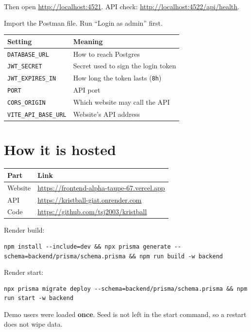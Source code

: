 \documentclass[11pt,a4paper]{article}
\newcommand{\livefront}{https://frontend-alpha-taupe-67.vercel.app}
\newcommand{\liveapi}{https://kristball-giat.onrender.com}
\newcommand{\livegit}{https://github.com/tsj2003/kristball}
\begin{document}
Then open \url{http://localhost:4521}. API check: \url{http://localhost:4522/api/health}.

Import the Postman file. Run ``Login as admin'' first.

\begin{center}
\begin{tabular}{ll}
\toprule
\textbf{Setting} & \textbf{Meaning} \\
\midrule
\texttt{DATABASE\_URL} & How to reach Postgres \\
\texttt{JWT\_SECRET} & Secret used to sign the login token \\
\texttt{JWT\_EXPIRES\_IN} & How long the token lasts (\texttt{8h}) \\
\texttt{PORT} & API port \\
\texttt{CORS\_ORIGIN} & Which website may call the API \\
\texttt{VITE\_API\_BASE\_URL} & Website's API address \\
\bottomrule
\end{tabular}
\end{center}

\section{How it is hosted}

\begin{center}
\begin{tabular}{ll}
\toprule
\textbf{Part} & \textbf{Link} \\
\midrule
Website & \url{\livefront} \\
API & \url{\liveapi} \\
Code & \url{\livegit} \\
\bottomrule
\end{tabular}
\end{center}

Render build:

\begin{lstlisting}
npm install --include=dev && npx prisma generate --schema=backend/prisma/schema.prisma && npm run build -w backend
\end{lstlisting}

Render start:

\begin{lstlisting}
npx prisma migrate deploy --schema=backend/prisma/schema.prisma && npm run start -w backend
\end{lstlisting}

Demo users were loaded \textbf{once}. Seed is not left in the start command, so a restart does not wipe data.
\end{document}
